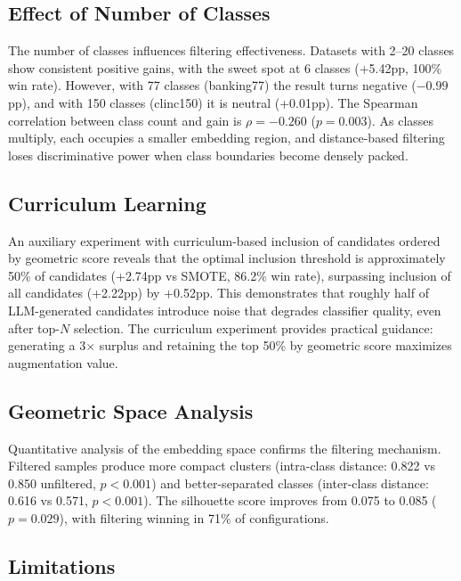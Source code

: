 \documentclass[conference]{IEEEtran}
\begin{document}
\subsection{Effect of Number of Classes}

The number of classes influences filtering effectiveness. Datasets with 2--20 classes show consistent positive gains, with the sweet spot at 6 classes (+5.42pp, 100\% win rate). However, with 77 classes (banking77) the result turns negative ($-0.99$pp), and with 150 classes (clinc150) it is neutral (+0.01pp). The Spearman correlation between class count and gain is $\rho = -0.260$ ($p = 0.003$). As classes multiply, each occupies a smaller embedding region, and distance-based filtering loses discriminative power when class boundaries become densely packed.

\subsection{Curriculum Learning}

An auxiliary experiment with curriculum-based inclusion of candidates ordered by geometric score reveals that the optimal inclusion threshold is approximately 50\% of candidates (+2.74pp vs SMOTE, 86.2\% win rate), surpassing inclusion of all candidates (+2.22pp) by +0.52pp. This demonstrates that roughly half of LLM-generated candidates introduce noise that degrades classifier quality, even after top-$N$ selection. The curriculum experiment provides practical guidance: generating a 3$\times$ surplus and retaining the top 50\% by geometric score maximizes augmentation value.

\subsection{Geometric Space Analysis}

Quantitative analysis of the embedding space confirms the filtering mechanism. Filtered samples produce more compact clusters (intra-class distance: 0.822 vs 0.850 unfiltered, $p<0.001$) and better-separated classes (inter-class distance: 0.616 vs 0.571, $p<0.001$). The silhouette score improves from 0.075 to 0.085 ($p=0.029$), with filtering winning in 71\% of configurations.

\subsection{Limitations}
\end{document}
